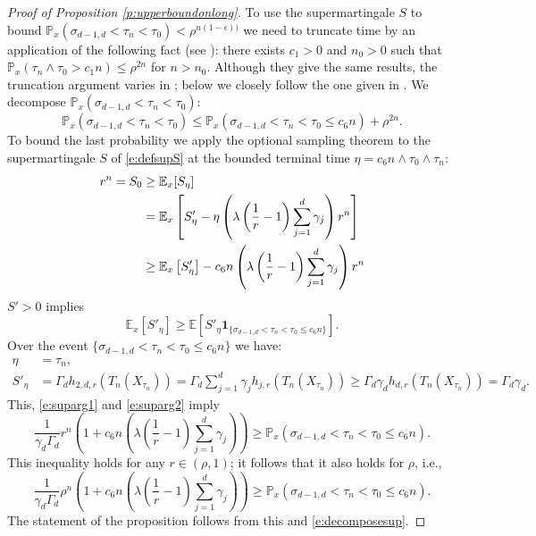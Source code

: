 \documentclass[11pt,a4paper]{article}
\begin{document}
\begin{proof}[Proof of Proposition \ref{p:upperboundonlong}]
To use the supermartingale $S$ to bound 
${\mathbb P}_{x}(\sigma_{d-1,d} < \tau_n < \tau_0) < \rho^{n(1-\epsilon))}$
we need to truncate time by an application of the following
fact (see \cite[Theorem A.1.1]{thesis}):
there exists $c_1 > 0$ and $n_0 > 0$ such that
${\mathbb P}_x(\tau_n \wedge \tau_0 > c_1n)  \le \rho^{2n}$
for $n > n_0$.
Although they give the
same results, the truncation argument varies in \cite{sezer2018approximation,unlu2019excessive,kabran2020approximation};
below we closely follow the one given in \cite{kabran2020approximation}.
We decompose
${\mathbb P}_{x}(\sigma_{d-1,d} < \tau_n < \tau_0)$:
\begin{equation}\label{e:decomposesup}
{\mathbb P}_{x}(\sigma_{d-1,d} < \tau_n < \tau_0)
\le
{\mathbb P}_{x}(\sigma_{d-1,d} < \tau_n < \tau_0 \le c_6 n) + 
\rho^{2n}.
\end{equation}
To bound the last probability we apply the optional sampling theorem
to the supermartingale $S$ of \eqref{e:defsupS} at the bounded terminal time
$\eta = c_6 n \wedge \tau_0 \wedge \tau_n$:
\begin{align}
r^n = S_0 &\ge {\mathbb E}_{x}[ S_{\eta}]\notag\\
     &=	   {\mathbb E}_{x}\left[ S'_\eta - \eta \left( \lambda \left(\frac{1}{r} -1\right) \sum_{j=1}^d \gamma_j \right) r^n \right]\notag \\
	&\ge 
    	   {\mathbb E}_{x}\left[ S'_\eta\right] 
- c_6 n\left( \lambda \left(\frac{1}{r} -1\right) \sum_{j=1}^d \gamma_j \right) r^n \label{e:suparg1}
\end{align}
$S' > 0$ implies
\begin{equation}\label{e:suparg2}
{\mathbb E}_x[S'_\eta] \ge 
{\mathbb E}[S'_\eta {\bm 1}_{\{\sigma_{d-1,d} < \tau_n < \tau_0 \le c_6n\}}].
\end{equation}
Over the event $\{\sigma_{d-1,d} < \tau_n < \tau_0 \le c_6n \}$ we have:
\begin{align*}
\eta &= \tau_n, \\
S'_\eta &= \Gamma_d h_{2,d,r}(T_n(X_{\tau_n}))  
=
\Gamma_d \sum_{j=1}^d \gamma_j h_{j,r}(T_n(X_{\tau_n}))
\ge \Gamma_d \gamma_d h_{d,r}(T_n(X_{\tau_n})) = \Gamma_d \gamma_d.
\end{align*}
This, \eqref{e:suparg1} and \eqref{e:suparg2} imply
\[
\frac{1}{\gamma_d \Gamma_d} 
r^n \left( 1 + c_6 n\left( \lambda \left(\frac{1}{r} -1\right) \sum_{j=1}^d \gamma_j \right)\right)\ge 
{\mathbb P}_x(\sigma_{d-1,d} < \tau_n < \tau_0 \le c_6n).
\]
This inequality holds for any $r \in (\rho,1)$; it follows that it also holds
for $\rho$, i.e., 
\[
\frac{1}{\gamma_d \Gamma_d} 
\rho^n \left( 1 + c_6 n\left( \lambda \left(\frac{1}{r} -1\right) \sum_{j=1}^d \gamma_j \right)\right)\ge 
{\mathbb P}_x(\sigma_{d-1,d} < \tau_n < \tau_0 \le c_6n).
\]
The statement of the proposition follows from this and \eqref{e:decomposesup}.
\end{proof}
\end{document}
